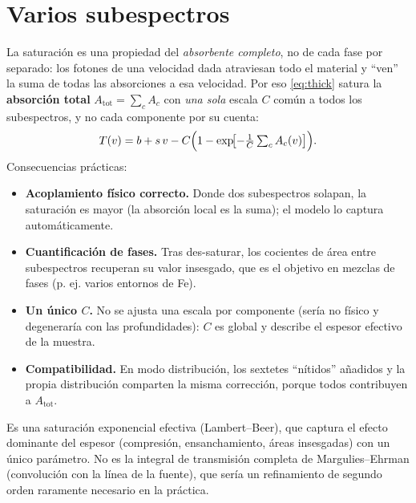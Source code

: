 \documentclass[11pt,a4paper]{article}
\begin{document}
\section{Varios subespectros}

La saturación es una propiedad del \emph{absorbente completo}, no de cada fase por
separado: los fotones de una velocidad dada atraviesan todo el material y ``ven''
la suma de todas las absorciones a esa velocidad. Por eso \eqref{eq:thick} satura
la \textbf{absorción total} $A_{\text{tot}}=\sum_c A_c$ con \emph{una sola} escala
$C$ común a todos los subespectros, y no cada componente por su cuenta:
\begin{equation}
  T(v) = b + s\,v - C\Bigl(1 - \exp\!\bigl[-\tfrac{1}{C}\textstyle\sum_c A_c(v)\bigr]\Bigr).
\end{equation}
Consecuencias prácticas:
\begin{itemize}[leftmargin=*]
  \item \textbf{Acoplamiento físico correcto.} Donde dos subespectros solapan, la
        saturación es mayor (la absorción local es la suma); el modelo lo captura
        automáticamente.
  \item \textbf{Cuantificación de fases.} Tras des-saturar, los cocientes de área
        entre subespectros recuperan su valor insesgado, que es el objetivo en
        mezclas de fases (p. ej. varios entornos de Fe).
  \item \textbf{Un único $C$.} No se ajusta una escala por componente (sería
        no físico y degeneraría con las profundidades): $C$ es global y describe el
        espesor efectivo de la muestra.
  \item \textbf{Compatibilidad.} En modo distribución, los sextetes ``nítidos''
        añadidos y la propia distribución comparten la misma corrección, porque
        todos contribuyen a $A_{\text{tot}}$.
\end{itemize}

\begin{nota}
Es una saturación exponencial efectiva (Lambert–Beer), que captura el efecto
dominante del espesor (compresión, ensanchamiento, áreas insesgadas) con un único
parámetro. No es la integral de transmisión completa de Margulies–Ehrman
(convolución con la línea de la fuente), que sería un refinamiento de segundo
orden raramente necesario en la práctica.
\end{nota}

\end{document}
